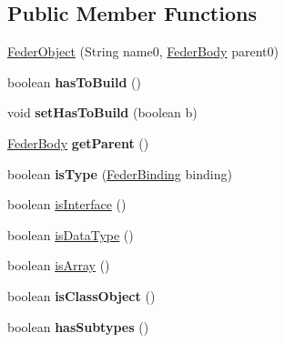 \subsection*{Public Member Functions}
\begin{DoxyCompactItemize}
\item 
\hyperlink{classfeder_1_1types_1_1FederObject_aeb1732353aa6704a36fcf17ed22fb4a5}{Feder\+Object} (String name0, \hyperlink{classfeder_1_1types_1_1FederBody}{Feder\+Body} parent0)
\item 
\mbox{\label{classfeder_1_1types_1_1FederObject_a5ecb7f0d59ee850fa72a587453df2c5b}} 
boolean {\bfseries has\+To\+Build} ()
\item 
\mbox{\label{classfeder_1_1types_1_1FederObject_af845d4ec611829f585906a0fc5e59f64}} 
void {\bfseries set\+Has\+To\+Build} (boolean b)
\item 
\mbox{\label{classfeder_1_1types_1_1FederObject_ad0e1f8753b4b03d0696e62034e134d46}} 
\hyperlink{classfeder_1_1types_1_1FederBody}{Feder\+Body} {\bfseries get\+Parent} ()
\item 
\mbox{\label{classfeder_1_1types_1_1FederObject_a79fb75fa1f32698afcd869b6b1d3e80f}} 
boolean {\bfseries is\+Type} (\hyperlink{classfeder_1_1types_1_1FederBinding}{Feder\+Binding} binding)
\item 
boolean \hyperlink{classfeder_1_1types_1_1FederObject_a02dd0040b45efef9ebc21015c04f9f68}{is\+Interface} ()
\item 
boolean \hyperlink{classfeder_1_1types_1_1FederObject_af28926b03ecb38e8d622db9d8857430c}{is\+Data\+Type} ()
\item 
boolean \hyperlink{classfeder_1_1types_1_1FederObject_ab7dfff2509df360900b2680fa1ef06fb}{is\+Array} ()
\item 
\mbox{\label{classfeder_1_1types_1_1FederObject_a0f027f65d3acb0b2ac8ba619197002f4}} 
boolean {\bfseries is\+Class\+Object} ()
\item 
\mbox{\label{classfeder_1_1types_1_1FederObject_a4e16ffb73532cdc8b7777ca3169fa3d6}} 
boolean {\bfseries has\+Subtypes} ()
\item 

\end{DoxyCompactItemize}
